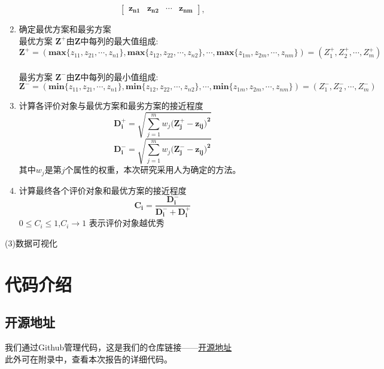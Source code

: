 \documentclass[UTF8]{ctexart}
\begin{document}
\begin{enumerate}
\begin{equation}
\begin{bmatrix}
		\bm{z_{n1}} & \bm{z_{n2}} & \cdots & \bm{z_{nm}}
		\end{bmatrix},
		\end{equation}
		\item 确定最优方案和最劣方案 \\
		最优方案 $\bm{Z^{+}}$由$\bm{Z}$中每列的最大值组成:
		\begin{equation}
		\bm{Z^{+}}=(\bm{max}\{z_{11},z_{21},\cdots,z_{n1}\},\bm{max}\{z_{12},z_{22},\cdots,z_{n2}\},\cdots,\bm{max}\{z_{1m},z_{2m},\cdots,z_{nm}\})
		=(Z_1^{+},Z_2^{+},\cdots,Z_m^{+})
		\end{equation}\\
		最劣方案 $\bm{Z^{-}}$由$\bm{Z}$中每列的最小值组成:
		\begin{equation}
		\bm{Z^{-}}=(\bm{min}\{z_{11},z_{21},\cdots,z_{n1}\},\bm{min}\{z_{12},z_{22},\cdots,z_{n2}\},\cdots,\bm{min}\{z_{1m},z_{2m},\cdots,z_{nm}\})=(Z_1^{-},Z_2^{-},\cdots,Z_m^{-})
		\end{equation}
		\item 计算各评价对象与最优方案和最劣方案的接近程度
		\begin{equation}
		\bm{D_i^{+}}=\sqrt{\sum_{j=1}^m {w_j(\bm{Z_j^{+}-z_{ij})^2}}}
		\end{equation}
		\begin{equation}
		\bm{D_i^{-}}=\sqrt{\sum_{j=1}^m {w_j(\bm{Z_j^{-}-z_{ij})^2}}}
		\end{equation}
		其中$w_j$是第$j$个属性的权重，本次研究采用人为确定的方法。
		\item 计算最终各个评价对象和最优方案的接近程度
		\begin{equation}
		\bm{C_i}=\frac{\bm{D_i^{-}}}{\bm{D_i^{-}}+\bm{D_i^{+}}}
		\end{equation}
		$0 \leq C_i \leq 1$,$C_i \rightarrow 1$ 表示评价对象越优秀
	\end{enumerate}
	\par (3)数据可视化
	\section{代码介绍}\label{sec3}
	\subsection{开源地址}
	我们通过Github管理代码，这是我们的仓库链接——\href{https://github.com/Coolingsky167/DataScienceHomework}{开源地址}\\
	此外可在附录中，查看本次报告的详细代码。
\end{document}
